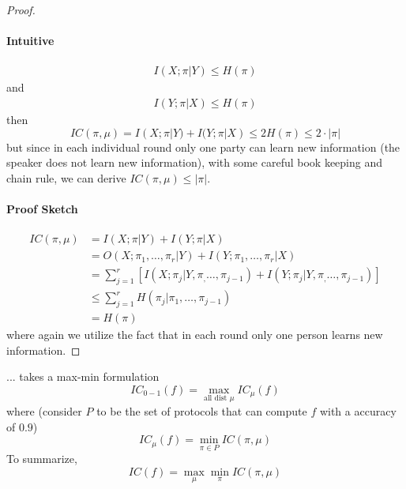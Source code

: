 \begin{proof}
	\paragraph{Intuitive} 
	\begin{align}
		I(X;\pi |Y) \leq H(\pi)
	\end{align}
	and 
	\begin{align}
		I(Y;\pi |X) \leq H(\pi)
	\end{align}
	then
	\begin{equation}
		IC(\pi, \mu) = I(X;\pi |Y) + I(Y; \pi |X) \leq 2H(\pi) \leq 2 \cdot |\pi|
	\end{equation}
	but since in each individual round only one party can learn new information (the speaker does not learn new information), with some careful book keeping and chain rule, we can derive $IC(\pi, \mu) \leq |\pi|$. 
	\paragraph{Proof Sketch}
	\begin{align}
		IC(\pi, \mu) 
		&= I(X;\pi |Y) + I(Y; \pi |X) \\
		&= O(X; \pi_1, \dots, \pi_r |Y ) + I(Y ; \pi_1, \dots, \pi_r |X) \\
		&= \sum_{j = 1}^r \left[ I(X; \pi_j |Y, \pi_, \dots, \pi_{j - 1} ) + I(Y; \pi_j |Y, \pi_, \dots, \pi_{j - 1} ) \right] \\
		&\leq \sum_{j = 1}^r H(\pi_j | \pi_1, \dots, \pi_{j - 1} ) \\
		&= H(\pi)
	\end{align}
	where again we utilize the fact that in each round only one person learns new information. 
\end{proof}

\begin{definition}
	... takes a max-min formulation
	\begin{equation}
		IC_{0-1}(f) = \max_{\text{all dist } \mu} IC_\mu (f)
	\end{equation}
	where (consider $P$ to be the set of protocols that can compute $f$ with a accuracy of $0.9$)
	\begin{equation}
		IC_\mu(f) = \min_{\pi \in P} IC(\pi, \mu)
	\end{equation}
	To summarize, 
	\begin{equation}
		IC(f) = \max_\mu \min_\pi IC(\pi, \mu)
	\end{equation}
\end{definition}

